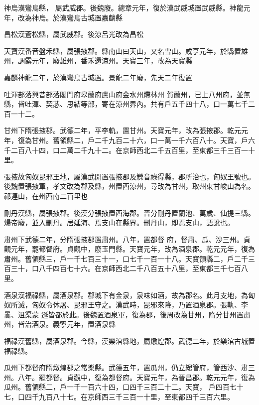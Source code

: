 \begin{pinyinscope}
 神烏漢鸞鳥縣，
 屬武威郡。後魏廢。總章元年，復於漢武威城置武威縣。神龍元年，改為神烏。於漢鸞鳥古城置嘉麟縣



 昌松漢蒼松縣，屬武威郡。後涼呂光改為昌松



 天寶漢番音盤禾縣，屬張掖郡。縣南山曰天山，又名雪山。咸亨元年，於縣置雄州，調露元年，廢雄州，番禾還涼州。天寶三年，改為天寶縣



 嘉麟神龍二年，於漢鸞鳥古城置。景龍二年廢，先天二年復置



 吐渾部落興昔部落閣門府皋蘭府盧山府金水州蹛林州
 賀蘭州，已上八州府，並無縣，皆吐渾、契苾、思結等部，寄在涼州界內。共有戶五千四十八，口一萬七千二百一十二。



 甘州下隋張掖郡。武德二年，平李軌，置甘州。天寶元年，改為張掖郡。乾元元年，復為甘州。舊領縣二，戶二千九百二十六，口一萬一千六百八十。天寶，戶六千二百八十四，口二萬二千九十二。在京師西北二千五百里，至東都三千三百一十里。



 張掖故匈奴昆邪王地，屬漢武開置張掖郡及觻音祿得縣，郡所治也，匈奴王號也。後魏置張掖軍，孝文改為郡及縣，州置西涼州，尋改為甘州，取州東甘峻山為名。祁連山，在州西南二百里也



 刪丹漢縣，屬張掖郡。後漢分張掖置西海郡。晉分刪丹置蘭池、萬歲、仙提三縣。煬帝廢，並入刪丹。居延海、焉支山在縣界。刪丹山，即焉支山，語訛也。



 肅州下武德二年，分隋張掖郡置肅州。八年，置都督
 府，督肅、瓜、沙三州。貞觀元年，罷都督府。貞觀中，廢玉門縣。天寶元年，改為酒泉郡。乾元元年，復為肅州。舊領縣三，戶一千七百三十一，口七千一百一十八。天寶領縣二，戶二千三百三十，口八千四百七十六。在京師西北二千八百五十八里，至東都三千七百八里。



 酒泉漢福祿縣，屬酒泉郡。郡城下有金泉，泉味如酒，故為郡名。此月支地，為匈奴所滅，匈奴令休屠、昆邪王守之。漢武時，昆邪來降，乃置酒泉郡。張軌、李暠、沮渠蒙
 遜皆都於此。後魏置酒泉軍，復為郡，後周改為甘州，隋分甘州置肅州，皆治酒泉。義寧元年，置酒泉縣



 福祿漢舊縣，屬酒泉郡。今縣，漢樂涫縣地，屬燉煌郡。武德二年，於樂涫古城置福祿縣。



 瓜州下都督府隋燉煌郡之常樂縣。武德五年，置瓜州，仍立總管府，管西沙、肅三州。八年。罷都督。貞觀中，復為都督府。天寶元年，為晉昌郡。乾元元年，復為瓜州。舊領縣二，戶一千一百六十四，口四千三百二十二。天寶，
 戶四百七十七，口四千九百八十七。在京師西三千三百一十里，至東都四千三百六里。




\end{pinyinscope}
